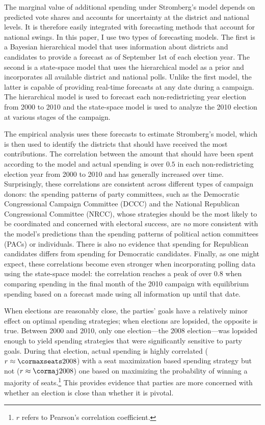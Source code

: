 \documentclass[12pt,final,fleqn]{article}
\theoremstyle{plain}
\begin{document}
The marginal value of additional spending under Stromberg's model depends on predicted vote shares and accounts for uncertainty at the district and national levels. It is therefore easily integrated with forecasting methods that account for national swings. In this paper, I use two types of forecasting models. The first is a Bayesian hierarchical model that uses information about districts and candidates to provide a forecast as of September 1st of each election year. The second is a state-space model that uses the hierarchical model as a prior and incorporates all available district and national polls. Unlike the first model, the latter is capable of providing real-time forecasts at any date during a campaign. The hierarchical model is used to forecast each non-redistricting year election from 2000 to 2010 and the state-space model is used to analyze the 2010 election at various stages of the campaign.

The empirical analysis uses these forecasts to estimate Stromberg's model, which is then used to identify the districts that should have received the most contributions. The correlation between the amount that should have been spent according to the model and actual spending is over $0.5$ in each non-redistricting election year from 2000 to 2010 and has generally increased over time. Surprisingly, these correlations are consistent across different types of campaign donors: the spending patterns of party committees, such as the Democratic Congressional Campaign Committee (DCCC) and the National Republican Congressional Committee (NRCC), whose strategies should be the most likely to be coordinated and concerned with electoral success, are \emph{no} more consistent with the model's predictions than the spending patterns of political action committees (PACs) or individuals. There is also no evidence that spending for Republican candidates differs from spending for Democratic candidates. Finally, as one might expect, these correlations become even stronger when incorporating polling data using the state-space model: the correlation reaches a peak of over 0.8 when comparing spending in the final month of the 2010 campaign with equilibrium spending based on a forecast made using all information up until that date.

When elections are reasonably close, the parties' goals have a relatively minor effect on optimal spending strategies; when elections are lopsided, the opposite is true. Between 2000 and 2010, only one election---the 2008 election---was lopsided enough to yield spending strategies that were significantly sensitive to party goals. During that election, actual spending is highly correlated ($r \approx \cormaxseats2008$) with a seat maximization based spending strategy but not ($r \approx \cormaj2008$) one based on maximizing the probability of winning a majority of seats.\footnote{$r$ refers to Pearson's correlation coefficient.} This provides evidence that parties are more concerned with whether an election is close than whether it is pivotal. 
\end{document}
